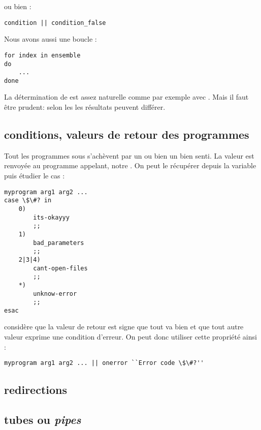 ou bien :
\begin{lstlisting}
condition || condition_false 
\end{lstlisting}

Nous avons aussi une boucle  :
\begin{lstlisting}
for index in ensemble
do
	...
done
\end{lstlisting}

La détermination de  est assez naturelle comme par exemple avec . Mais il faut être prudent: selon les \shells les résultats peuvent différer.

\subsection{conditions, valeurs de retour des programmes}

Tout les programmes sous \unix s'achèvent par un  ou bien un  bien senti. La valeur  est renvoyée au programme appelant, notre \shell. On peut le récupérer depuis la variable  puis étudier le cas :
\begin{lstlisting}
myprogram arg1 arg2 ...
case \$\#? in
	0)
		its-okayyy
		;;
	1)
		bad_parameters
		;;
	2|3|4)
		cant-open-files
		;;
	*)
		unknow-error
		;;
esac
\end{lstlisting}

\unix considère que la valeur de retour  est signe que tout va bien et que tout autre valeur exprime une condition d'erreur. On peut donc utiliser cette propriété ainsi :

\begin{lstlisting}
myprogram arg1 arg2 ... || onerror ``Error code \$\#?''
\end{lstlisting}

\subsection{redirections}

\subsection{tubes ou \emph{pipes}}
